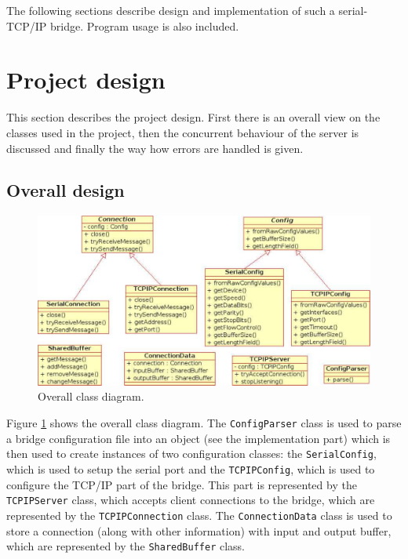 The following sections describe design and implementation of such a serial-TCP/IP bridge.
Program usage is also included.

\section{Project design}

This section describes the project design. First there is an overall view
on the classes used in the project, then the concurrent behaviour of the server
is discussed and finally the way how errors are handled is given.

\subsection{Overall design}

\begin{figure}[ht!]
	\begin{center}
		\includegraphics[width=14cm,keepaspectratio]{overall-class-diagram}
		\caption{Overall class diagram.}
		\label{overall-class-diagram}
	\end{center}
\end{figure}

Figure \ref{overall-class-diagram} shows the overall class diagram.
The \texttt{ConfigParser} class is used to parse a bridge configuration file into
an object (see the implementation part) which is then used to create instances
of two configuration classes:
the \texttt{SerialConfig}, which is used to setup the serial port and the \texttt{TCPIPConfig},
which is used to configure the TCP/IP part of the bridge. This part is represented
by the \texttt{TCPIPServer} class, which accepts client connections to the bridge,
which are represented by the \texttt{TCPIPConnection} class.
The \texttt{ConnectionData} class is used to store a connection (along with
other information) with input and output buffer, which are represented by
the \texttt{SharedBuffer} class.

